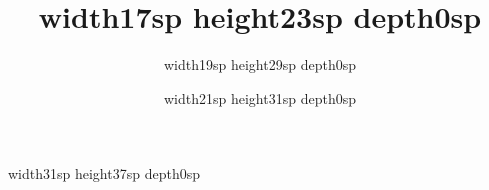 \documentclass[a4paper,10pt]{prjsarticle}
\title{\vrule width17sp height23sp depth0sp}
\author{\vrule width19sp height29sp depth0sp}
\date{\vrule width21sp height31sp depth0sp}
\begin{document}
\maketitle
\noindent\vrule width31sp height37sp depth0sp\par
\end{document}
